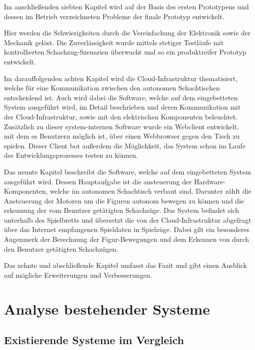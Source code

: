 Im anschließenden siebten Kapitel wird auf der Basis des ersten
Prototypens und dessen im Betrieb verzeichneten Probleme der finale
Prototyp entwickelt.

Hier werden die Schwierigkeiten durch die Vereinfachung der Elektronik
sowie der Mechanik gelöst. Die Zuverlässigkeit wurde mittels stetiger
Testläufe mit kontrollierten Schachzug-Szenarien überwacht und so ein
produktreifer Prototyp entwickelt.

Im darauffolgenden achten Kapitel wird die Cloud-Infrastruktur
thematisiert, welche für eine Kommunikation zwischen den autonomen
Schachtischen entscheidend ist. Auch wird dabei die Software, welche auf
dem eingebetteten System ausgeführt wird, im Detail beschrieben und
deren Kommunikation mit der Cloud-Infrastruktur, sowie mit den
elektrischen Komponenten beleuchtet. Zusätzlich zu dieser
system-internen Software wurde ein Webclient entwickelt, mit dem es
Benutzern möglich ist, über einen Webbrowser gegen den Tisch zu spielen.
Dieser Client bot außerdem die Möglichkeit, das System schon im Laufe
des Entwicklungsprozesses testen zu können.

Das neunte Kapitel beschreibt die Software, welche auf dem eingebetteten
System ausgeführt wird. Dessen Hauptaufgabe ist die ansteuerung der
Hardware-Komponenten, welche im autonomen Schachtisch verbaut sind.
Darunter zählt die Ansteuerung der Motoren um die Figuren autonom
bewegen zu können und die erkennung der vom Benutzer getätigten
Schachzüge. Das System befindet sich unterhalb des Spielbretts und
übersetzt die von der Cloud-Infrastruktur abgefragt über das Internet
empfangenen Spieldaten in Spielzüge. Dabei gilt ein besonderes Augenmerk
der Berechnung der Figur-Bewegungen und dem Erkennen von durch den
Benutzer getätigten Schachzügen.

Das zehnte und abschließende Kapitel umfasst das Fazit und gibt einen
Ausblick auf mögliche Erweiterungen und Verbesserungen.

\hypertarget{analyse-bestehender-systeme}{%
\chapter{Analyse bestehender
Systeme}\label{analyse-bestehender-systeme}}

\hypertarget{existierende-systeme-im-vergleich}{%
\section{Existierende Systeme im
Vergleich}\label{existierende-systeme-im-vergleich}}

